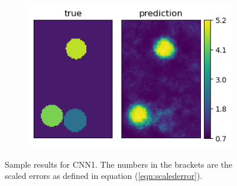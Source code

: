 \documentclass[12pt]{article}
\newcommand{\nhghalfwidth}{0.48\linewidth}
\newcommand{\nhgtotalheight}{4cm}
\begin{document}
\begin{figure}[!h]
\begin{subfigure}[c]{\nhghalfwidth}
  \end{subfigure}
  \begin{subfigure}[c]{\nhghalfwidth}
    \centering
    \includegraphics[totalheight=\nhgtotalheight]{Figures/Results1/ex4/mu.png}
  \end{subfigure}
\caption{\label{fig:cnn1result} Sample results for CNN1. The numbers in the brackets are the scaled errors as defined in equation (\ref{eqn:scalederror}).}  
\end{figure}
%
\end{document}
